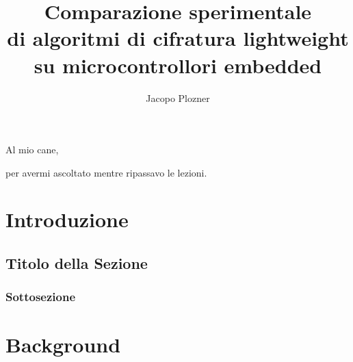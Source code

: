 \documentclass[target=bach,aauheader=,style=]{thud}
\title{Comparazione sperimentale \\ di algoritmi di cifratura lightweight \\ su microcontrollori embedded}
\author{Jacopo Plozner}
\begin{document}
\maketitle

\begin{dedication}
	Al mio cane,\par per avermi ascoltato mentre ripassavo le lezioni.
\end{dedication}

\acknowledgements


\abstract


\tableofcontents



\mainmatter


\chapter{Introduzione}

    \section{Titolo della Sezione}


    \subsection{Sottosezione}

\chapter{Background}
\end{document}
